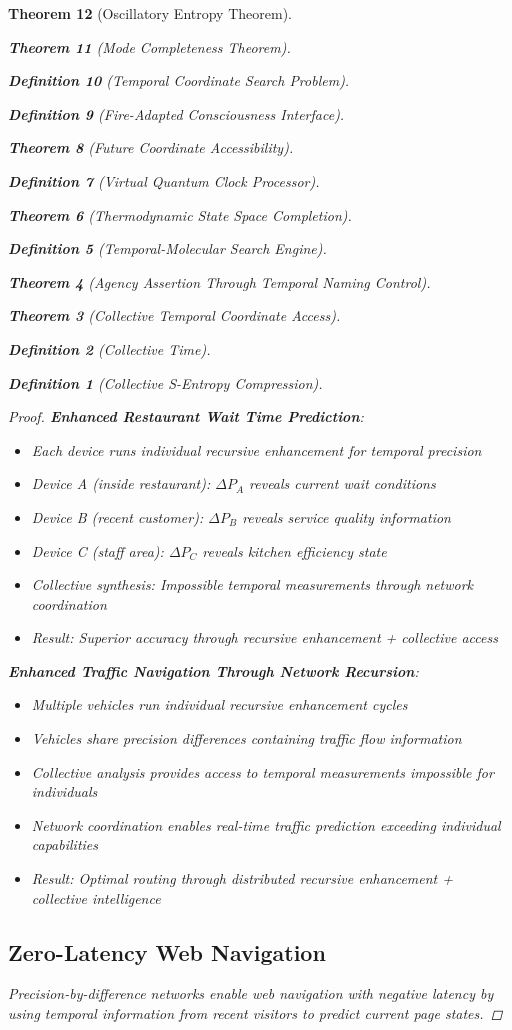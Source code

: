 \documentclass[12pt,a4paper]{article}
\newtheorem{theorem}{Theorem}[section]
\newtheorem{definition}[theorem]{Definition}
\begin{document}
\begin{theorem}[Oscillatory Entropy Theorem]
\begin{theorem}[Mode Completeness Theorem]
\begin{enumerate}
\begin{definition}[Temporal Coordinate Search Problem]
\begin{algorithm}
\begin{definition}[Fire-Adapted Consciousness Interface]
\begin{theorem}[Future Coordinate Accessibility]
\begin{definition}[Virtual Quantum Clock Processor]
\begin{itemize}
\begin{itemize}
\begin{theorem}[Thermodynamic State Space Completion]
\begin{definition}[Temporal-Molecular Search Engine]
\begin{theorem}[Agency Assertion Through Temporal Naming Control]
\begin{remark}
\begin{theorem}[Collective Temporal Coordinate Access]
\begin{definition}[Collective Time]
\begin{definition}[Collective S-Entropy Compression]
\begin{proof}
\textbf{Enhanced Restaurant Wait Time Prediction}:
\begin{itemize}
\item Each device runs individual recursive enhancement for temporal precision
\item Device A (inside restaurant): $\Delta P_A$ reveals current wait conditions
\item Device B (recent customer): $\Delta P_B$ reveals service quality information
\item Device C (staff area): $\Delta P_C$ reveals kitchen efficiency state
\item Collective synthesis: Impossible temporal measurements through network coordination
\item Result: Superior accuracy through recursive enhancement + collective access
\end{itemize}

\textbf{Enhanced Traffic Navigation Through Network Recursion}:
\begin{itemize}
\item Multiple vehicles run individual recursive enhancement cycles
\item Vehicles share precision differences containing traffic flow information
\item Collective analysis provides access to temporal measurements impossible for individuals
\item Network coordination enables real-time traffic prediction exceeding individual capabilities
\item Result: Optimal routing through distributed recursive enhancement + collective intelligence
\end{itemize}

\subsection{Zero-Latency Web Navigation}

Precision-by-difference networks enable web navigation with negative latency by using temporal information from recent visitors to predict current page states.


\end{proof}
\end{definition}
\end{definition}
\end{theorem}
\end{remark}
\end{theorem}
\end{definition}
\end{theorem}
\end{itemize}
\end{itemize}
\end{definition}
\end{theorem}
\end{definition}
\end{algorithm}
\end{definition}
\end{enumerate}
\end{theorem}
\end{theorem}
\end{document}
